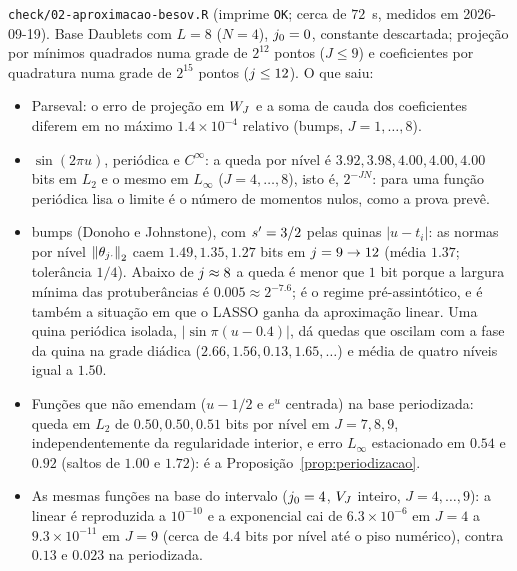 \documentclass[11pt,a4paper]{article}
\begin{document}
\texttt{check/02-aproximacao-besov.R} (imprime \texttt{OK}; cerca de
$72$~s, medidos em 2026-09-19).
Base Daublets com $L = 8$ ($N = 4$), $j_{0} = 0$, constante descartada;
projeção por mínimos quadrados numa grade de $2^{12}$ pontos ($J \le 9$) e
coeficientes por quadratura numa grade de $2^{15}$ pontos ($j \le 12$). O
que saiu:
\begin{itemize}[nosep]
  \item Parseval: o erro de projeção em $W_{J}$ e a soma de cauda dos
    coeficientes diferem em no máximo $1.4\times10^{-4}$ relativo (bumps,
    $J = 1, \dots, 8$).
  \item $\sin(2\pi u)$, periódica e $C^{\infty}$: a queda por nível é
    $3.92, 3.98, 4.00, 4.00, 4.00$ bits em $L_{2}$ e o mesmo em $L_{\infty}$
    ($J = 4, \dots, 8$), isto é, $2^{-JN}$: para uma função periódica lisa o
    limite é o número de momentos nulos, como a prova prevê.
  \item bumps (Donoho e Johnstone), com $s' = 3/2$ pelas quinas
    $|u - t_{i}|$: as normas por nível $\left\lVert \theta_{j\cdot} \right\rVert_{2}$ caem
    $1.49, 1.35, 1.27$ bits em $j = 9 \to 12$ (média $1.37$; tolerância
    $1/4$). Abaixo de $j \approx 8$ a queda é menor que $1$ bit porque a
    largura mínima das protuberâncias é $0.005 \approx 2^{-7.6}$; é o regime
    pré-assintótico, e é também a situação em que o LASSO ganha da
    aproximação linear. Uma quina periódica isolada, $|\sin\pi(u - 0.4)|$, dá quedas que oscilam
    com a fase da quina na grade diádica ($2.66, 1.56, 0.13, 1.65, \dots$) e
    média de quatro níveis igual a $1.50$.
  \item Funções que não emendam ($u - 1/2$ e $e^{u}$ centrada) na base
    periodizada: queda em $L_{2}$ de $0.50, 0.50, 0.51$ bits por nível em
    $J = 7, 8, 9$, independentemente da regularidade interior, e erro
    $L_{\infty}$ estacionado em $0.54$ e $0.92$ (saltos de $1.00$ e $1.72$):
    é a Proposição~\ref{prop:periodizacao}.
  \item As mesmas funções na base do intervalo ($j_{0} = 4$, $V_{J}$
    inteiro, $J = 4, \dots, 9$): a linear é reproduzida a $10^{-10}$ e a
    exponencial cai de $6.3\times10^{-6}$ em $J = 4$ a $9.3\times10^{-11}$ em
    $J = 9$ (cerca de $4.4$ bits por nível até o piso numérico), contra
    $0.13$ e $0.023$ na periodizada.
\end{itemize}
\end{document}
